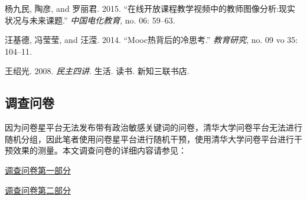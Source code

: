 \documentclass[
  12pt,
]{ctexart}
\newlength{\cslhangindent}
\newlength{\cslentryspacingunit} %
\newenvironment{CSLReferences}[2] %
 {%
  \setlength{\parindent}{0pt}
  \ifodd #1
  \let\oldpar\par
  \def\par{\hangindent=\cslhangindent\oldpar}
  \fi
  \setlength{\parskip}{#2\cslentryspacingunit}
 }%
 {}
\begin{document}
\begin{CSLReferences}{1}{0}
\leavevmode{}%
杨九民, 陶彦, and 罗丽君. 2015. {``{在线开放课程教学视频中的教师图像分析:现实状况与未来课题}.''} \emph{中国电化教育}, no. 06: 59--63.

\leavevmode{}%
汪基德, 冯莹莹, and 汪滢. 2014. {``{Mooc热背后的冷思考}.''} \emph{教育研究}, no. 09 vo 35: 104--11.

\leavevmode{}%
王绍光. 2008. \emph{{民主四讲}}. {生活. 读书. 新知三联书店}.

\end{CSLReferences}

\break

\hypertarget{appendix-supplementary-materials}{%
\appendix}


\hypertarget{ux8c03ux67e5ux95eeux5377}{%
\subsection{调查问卷}\label{ux8c03ux67e5ux95eeux5377}}

因为问卷星平台无法发布带有政治敏感关键词的问卷，清华大学问卷平台无法进行随机分组，因此笔者使用问卷星平台进行随机干预，使用清华大学问卷平台进行干预效果的测量。本文调查问卷的详细内容请参见：

\href{https://civtemoe.wjx.cn/vj/wdJmKjm.aspx}{调查问卷第一部分}

\href{http://wenjuan.tsinghua.edu.cn/s/vem6Jj/}{调查问卷第二部分}
\end{document}
